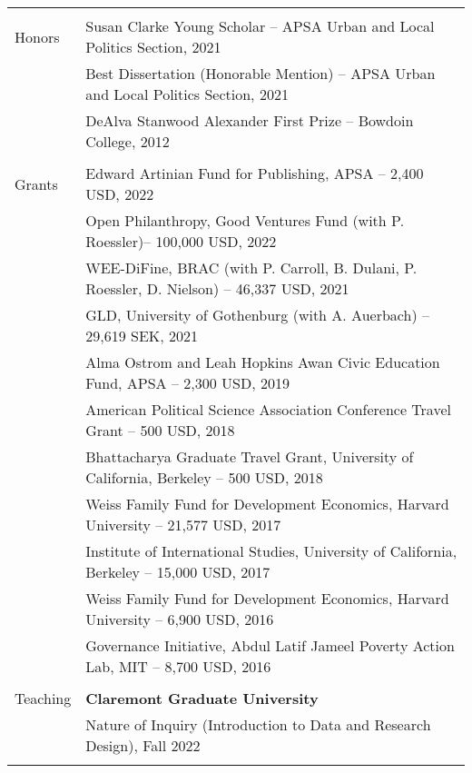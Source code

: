 \documentclass[letterpaper, 11pt]{article}
\begin{document}
\begin{longtable}{p{1in}p{5.5in}}
&\\




{{Honors}} 
& Susan Clarke Young Scholar  -- APSA Urban and Local Politics Section, 2021\\

& Best Dissertation  (Honorable Mention) --  APSA Urban and Local Politics Section, 2021 \\
& DeAlva Stanwood Alexander First Prize  --  Bowdoin College, 2012 \\

& \\

{{Grants}} 
& Edward Artinian Fund for Publishing, APSA -- 2,400 USD, 2022\\
& Open Philanthropy, Good Ventures Fund (with P. Roessler)-- 100,000 USD, 2022\\
& WEE-DiFine, BRAC (with P. Carroll, B. Dulani, P. Roessler,  D. Nielson)
 -- 46,337 USD, 2021\\


& GLD, University of Gothenburg (with A. Auerbach)
-- 29,619 SEK, 2021 \\


& Alma Ostrom and Leah Hopkins Awan Civic Education Fund, APSA -- 2,300 USD, 2019\\

& American Political Science Association Conference Travel Grant -- 500 USD, 2018 \\
& Bhattacharya Graduate Travel Grant,  University of California, Berkeley -- 500 USD, 2018\\


& Weiss Family Fund for Development Economics, Harvard University -- 21,577 USD, 2017
\\

&Institute of International Studies, University of California, Berkeley -- 15,000 USD, 2017 \\

&Weiss Family Fund for Development Economics, Harvard University -- 6,900 USD, 2016  \\

&Governance Initiative, Abdul Latif Jameel Poverty Action Lab, MIT -- 8,700 USD, 2016 \\

& \\



{{Teaching}}  & \textbf{Claremont Graduate University} \\
&Nature of Inquiry (Introduction to Data and Research Design), Fall 2022 \\
&\\


\end{longtable}
\end{document}
